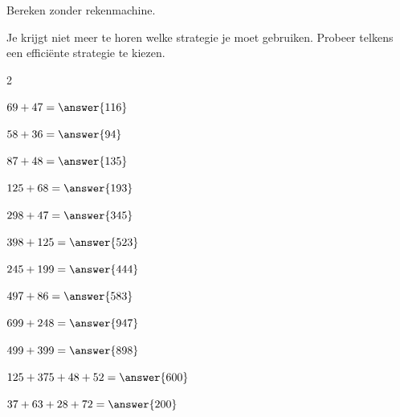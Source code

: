 \documentclass{ximera}
\begin{document}
\begin{oefening}{\oefU\ESS}

    Bereken zonder rekenmachine.
    
    Je krijgt niet meer te horen welke strategie je moet gebruiken.
    Probeer telkens een efficiënte strategie te kiezen.
    
    \begin{multicols}{2}
    
    \begin{question} \(69+47=\answer{116}\) \end{question}
    
    \begin{question} \(58+36=\answer{94}\) \end{question}
    
    \begin{question} \(87+48=\answer{135}\) \end{question}
    
    \begin{question} \(125+68=\answer{193}\) \end{question}
    
    \begin{question} \(298+47=\answer{345}\) \end{question}
    
    \begin{question} \(398+125=\answer{523}\) \end{question}
    
    \begin{question} \(245+199=\answer{444}\) \end{question}
    
    \begin{question} \(497+86=\answer{583}\) \end{question}
    
    \begin{question} \(699+248=\answer{947}\) \end{question}
    
    \begin{question} \(499+399=\answer{898}\) \end{question}
    
    \begin{question} \(125+375+48+52=\answer{600}\) \end{question}
    
    \begin{question} \(37+63+28+72=\answer{200}\) \end{question}
    

\end{multicols}
\end{oefening}
\end{document}
